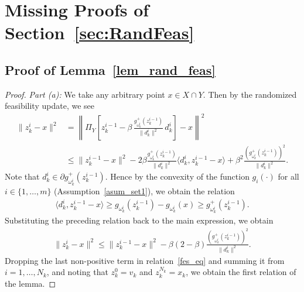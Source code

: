 \documentclass{article}
\def\la{\langle}
\def\ra{\rangle}
\theoremstyle{plain}
\theoremstyle{definition}
\theoremstyle{remark}
\begin{document}

\section{Missing Proofs of Section~\ref{sec:RandFeas}}

\subsection{Proof of Lemma~\ref{lem_rand_feas}}\label{lem_rand_feas_proof}

\begin{proof}
    \textit{Part (a):} We take any arbitrary point $x \in X \cap Y$. Then by the randomized feasibility update, we see
    \begin{align}
        \| z_k^i - x \|^2 &= \left\| \Pi_{Y} \left[z_{k}^{i-1} - \beta\, \frac{g^+_{\omega_{k}^{i}}(z_{k}^{i-1})}{\|d_{k}^{i}\|^2}\, d_{k}^{i}\right] - x \right\|^2 \nonumber\\
        & \leq \|z_{k}^{i-1} - x\|^2 - 2 \beta \frac{g^+_{\omega_{k}^{i}}(z_{k}^{i-1})}{\|d_{k}^{i}\|^2} \la d_{k}^{i}, z_{k}^{i-1} - x \ra + \beta^2 \frac{\left(g^+_{\omega_{k}^{i}}(z_{k}^{i-1})\right)^2}{\|d_{k}^{i}\|^2}. \nonumber
    \end{align}
Note that $d_k^i \in \partial g^+_{\omega_{k}^{i}}(z_{k}^{i-1})$. Hence by the convexity of the function $g_i(\cdot)$ for all $i \in \{1, \ldots,m\}$ (Assumption~\ref{asum_set1}), we obtain the relation
\begin{align}
    \la d_{k}^{i}, z_{k}^{i-1} - x \ra \geq g_{\omega_{k}^{i}}(z_{k}^{i-1}) - g_{\omega_{k}^{i}}(x) \geq g^+_{\omega_{k}^{i}}(z_{k}^{i-1}). \nonumber
\end{align}
Substituting the preceding relation back to the main expression, we obtain
\begin{align}
    \| z_k^i - x \|^2 \leq \|z_{k}^{i-1} - x\|^2 - \beta(2- \beta) \frac{\left(g^+_{\omega_{k}^{i}}(z_{k}^{i-1})\right)^2}{\|d_{k}^{i}\|^2} . \label{fes_eq}
\end{align}
Dropping the last non-positive term in relation~\eqref{fes_eq} and summing it from $i=1, \ldots, N_k$, and noting that $z_k^0 = v_k$ and $z_k^{N_k} = x_k$, we obtain the first relation of the lemma.




\end{proof}
\end{document}
